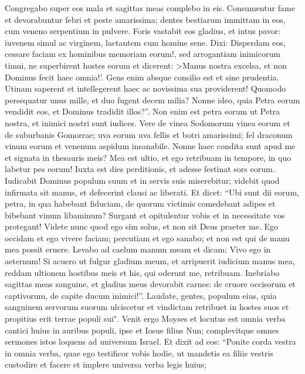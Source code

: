 \begin{biblechapter}
\verse Congregabo super eos mala et sagittas meas complebo in eis. 
\verse Consumentur fame et devorabuntur febri et peste amarissima; dentes bestiarum immittam in eos, cum veneno serpentium in pulvere. 
\verse Foris vastabit eos gladius, et intus pavor: iuvenem simul ac virginem, lactantem cum homine sene. 
\verse Dixi: Disperdam eos, cessare faciam ex hominibus memoriam eorum!, 
\verse sed arrogantiam inimicorum timui, ne superbirent hostes eorum et dicerent: >Manus nostra excelsa, et non Dominus fecit haec omnia!'. 
\verse Gens enim absque consilio est et sine prudentia. 
\verse Utinam saperent et intellegerent haec ac novissima sua providerent! 
\verse Quomodo persequatur unus mille, et duo fugent decem milia? Nonne ideo, quia Petra eorum vendidit eos, et Dominus tradidit illos?”. 
\verse Non enim est petra eorum ut Petra nostra, et inimici nostri sunt iudices. 
\verse Vere de vinea Sodomorum vinea eorum et de suburbanis Gomorrae; uva eorum uva fellis et botri amarissimi; 
\verse fel draconum vinum eorum et venenum aspidum insanabile. 
\verse Nonne haec condita sunt apud me et signata in thesauris meis? 
\verse Mea est ultio, et ego retribuam in tempore, in quo labetur pes eorum! Iuxta est dies perditionis, et adesse festinat sors eorum. 
\verse Iudicabit Dominus populum suum et in servis suis miserebitur; videbit quod infirmata sit manus, et defecerint clausi ac liberati. 
\verse Et dicet: “Ubi sunt dii eorum, petra, in qua habebant fiduciam, 
\verse de quorum victimis comedebant adipes et bibebant vinum libaminum? Surgant et opitulentur vobis et in necessitate vos protegant! 
\verse Videte nunc quod ego sim solus, et non sit Deus praeter me. Ego occidam et ego vivere faciam; percutiam et ego sanabo; et non est qui de manu mea possit eruere. 
\verse Levabo ad caelum manum meam et dicam: Vivo ego in aeternum! 
\verse Si acuero ut fulgur gladium meum, et arripuerit iudicium manus mea, reddam ultionem hostibus meis et his, qui oderunt me, retribuam. 
\verse Inebriabo sagittas meas sanguine, et gladius meus devorabit carnes: de cruore occisorum et captivorum, de capite ducum inimici!”. 
\verse Laudate, gentes, populum eius, quia sanguinem servorum suorum ulciscetur et vindictam retribuet in hostes suos et propitius erit terrae populi sui". 
\verse Venit ergo Moyses et locutus est omnia verba cantici huius in auribus populi, ipse et Iosue filius Nun; 
\verse complevitque omnes sermones istos loquens ad universum Israel. 
\verse Et dixit ad eos: “Ponite corda vestra in omnia verba, quae ego testificor vobis hodie, ut mandetis ea filiis vestris custodire et facere et implere universa verba legis huius; 

\end{biblechapter}
